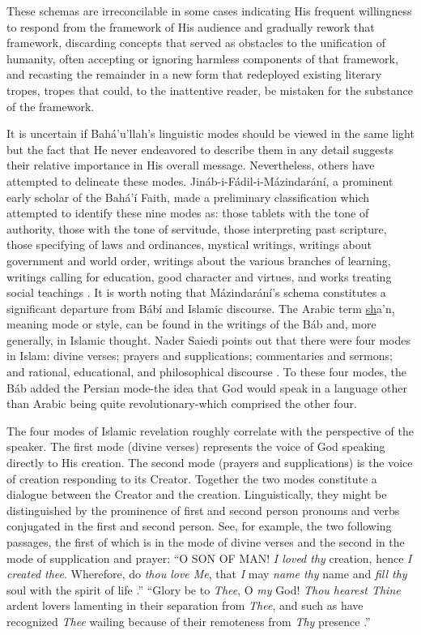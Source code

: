 \documentclass[12pt, oneside]{report}
\begin{document}
These schemas are irreconcilable in some cases indicating His frequent willingness to respond from the framework of His audience and gradually rework that framework, discarding concepts that served as obstacles to the unification of humanity, often accepting or ignoring harmless components of that framework, and recasting the remainder in a new form that redeployed existing literary tropes, tropes that could, to the inattentive reader, be mistaken for the substance of the framework.
\par
It is uncertain if Bah\'{a}'u'llah's linguistic modes should be viewed in the same light but the fact that He never endeavored to describe them in any detail suggests their relative importance in His overall message.
Nevertheless, others have attempted to delineate these modes.
Jin\'{a}b-i-F\'{a}dil-i-M\'{a}zindar\'{a}n\'{i}, a prominent early scholar of the Bah\'{a}'\'{i} Faith, made a preliminary classification which attempted to identify these nine modes as: those tablets with the tone of authority, those with the tone of servitude, those interpreting past scripture, those specifying of laws and ordinances, mystical writings, writings about government and world order, writings about the various branches of learning, writings calling for education, good character and virtues, and works treating social teachings \cite{}.
It is worth noting that M\'{a}zindar\'{a}n\'{i}'s schema constitutes a significant departure from B\'{a}b\'{i} and Islamic discourse. The Arabic term \underline{sh}a'n, meaning mode or style, can be found in the writings of the B\'{a}b and, more generally, in Islamic thought.
Nader Saiedi points out that there were four modes in Islam: divine verses; prayers and supplications; commentaries and sermons; and rational, educational, and philosophical discourse \cite{saiedi_gate_2008}.
To these four modes, the B\'{a}b added the Persian mode-the idea that God would speak in a language other than Arabic being quite revolutionary-which comprised the other four.
\par
The four modes of Islamic revelation roughly correlate with the perspective of the speaker.
The first mode (divine verses) represents the voice of God speaking directly to His creation.
The second mode (prayers and supplications) is the voice of creation responding to its Creator.
Together the two modes constitute a dialogue between the Creator and the creation.
Linguistically, they might be distinguished by the prominence of first and second person pronouns and verbs conjugated in the first and second person.
See, for example, the two following passages, the first of which is in the mode of divine verses and the second in the mode of supplication and prayer: ``O SON OF MAN! \emph{I loved thy} creation, hence \emph{I created thee}. Wherefore, do \emph{thou love Me}, that \emph{I} may \emph{name thy} name and \emph{fill thy} soul with the spirit of life \cite{bahaullah_hidden_2002}.'' ``Glory be to \emph{Thee}, O \emph{my} God!  \emph{Thou hearest Thine} ardent lovers lamenting in their separation from \emph{Thee}, and such as have recognized \emph{Thee} wailing because of their remoteness from \emph{Thy} presence \cite{}.''
\end{document}
